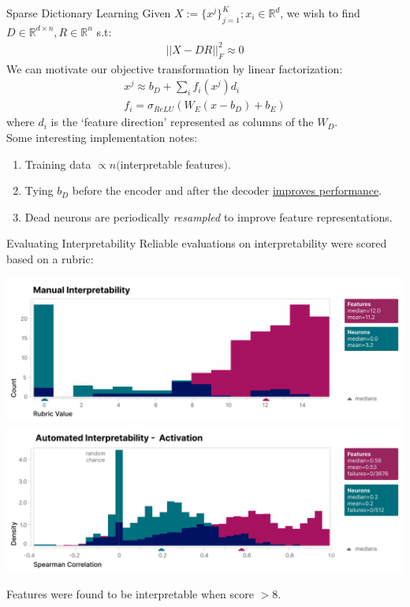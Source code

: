 \documentclass{beamer}
\begin{document}
\begin{frame}{Sparse Dictionary Learning}
	Given $X := \{x^j\}^K_{j=1}; x_i \in \mathbb{R}^d$, we wish to find $D \in \mathbb{R}^{d \times n}, R \in \mathbb{R}^n$ s.t:
	\begin{gather}
		||X-DR||^2_F \approx 0
	\end{gather} \pause
	We can motivate our objective transformation by linear factorization:
	\begin{gather}
		x^j \approx b_D + \sum_i f_i(x^j)d_i \\
		f_i = \sigma_{ReLU}(W_E(x-b_D)+ b_E)
	\end{gather}
	where $d_i$ is the `feature direction' represented as columns of the $W_D$. \pause \newline \\
	
	Some interesting implementation notes:
	\begin{enumerate}[label=\alph*.]
		\item Training data $\propto n($interpretable features$)$. \pause
		\item Tying $b_D$ before the encoder and after the decoder \underline{improves performance}. \pause
		\item Dead neurons are periodically \textit{resampled} to improve feature representations.
	\end{enumerate}
\end{frame}

\begin{frame}{Evaluating Interpretability}
	Reliable evaluations on interpretability were scored based on a rubric:
	\begin{center}
		\includegraphics[width=.7\textwidth]{img/scores.png}
		\includegraphics[width=.7\textwidth]{img/ascores-activ.png}
	\end{center}
	\vspace{-1em}
	Features were found to be interpretable when score $> 8$.
\end{frame}
\end{document}
